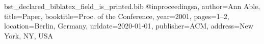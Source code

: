 \begin{filecontents*}[overwrite]{bst_declared_biblatex_field_is_printed.bib}
@inproceedings{a, author={Ann Able}, title={Paper}, booktitle={Proc. of the Conference}, year=2001, pages={1--2},
  location={Berlin, Germany}, urldate={2020-01-01}, publisher={ACM}, address={New York, NY, USA}}
\end{filecontents*}
\documentclass{article}
\usepackage{natbib}

X \citep{a}.



